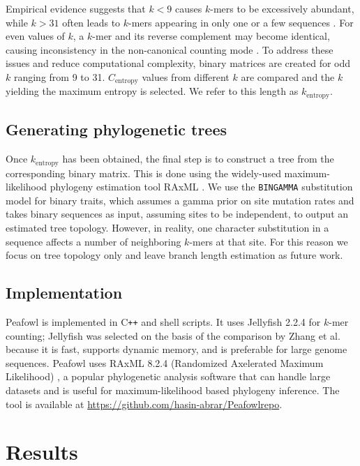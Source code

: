 \documentclass[11pt]{article}
\begin{document}
Empirical evidence suggests that $k < 9$ causes $k$-mers to be excessively abundant, while $k > 31$ often leads to $k$-mers appearing in only one or a few sequences \cite{rohling2020slopespam}. For even values of $k$, a $k$-mer and its reverse complement may become identical, causing inconsistency in the non-canonical counting mode \cite{marcais2018kmercanonical}. To address these issues and reduce computational complexity, binary matrices are created for odd $k$ ranging from 9 to 31. $C_{\text{entropy}}$ values from different $k$ are compared and the $k$ yielding the maximum entropy is selected. We refer to this length as $k_{\text{entropy}}$.

\subsection{Generating phylogenetic trees}

Once $k_{\text{entropy}}$ has been obtained, the final step is to construct a tree from the corresponding binary matrix. This is done using the widely-used maximum-likelihood phylogeny estimation tool RAxML \cite{stamatakis2014raxml}. We use the \texttt{BINGAMMA} substitution model for binary traits, which assumes a gamma prior on site mutation rates and takes binary sequences as input, assuming sites to be independent, to output an estimated tree topology. However, in reality, one character substitution in a sequence affects a number of neighboring $k$-mers at that site. For this reason we focus on tree topology only and leave branch length estimation as future work.

\subsection{Implementation}

Peafowl is implemented in C\texttt{++} and shell scripts. It uses Jellyfish 2.2.4 for $k$-mer counting; Jellyfish was selected on the basis of the comparison by Zhang et al.\ \cite{zhang2014kmercount} because it is fast, supports dynamic memory, and is preferable for large genome sequences. Peafowl uses RAxML 8.2.4 (Randomized Axelerated Maximum Likelihood) \cite{stamatakis2014raxml}, a popular phylogenetic analysis software that can handle large datasets and is useful for maximum-likelihood based phylogeny inference. The tool is available at \url{https://github.com/hasin-abrar/Peafowlrepo}.

\section{Results}
\end{document}
